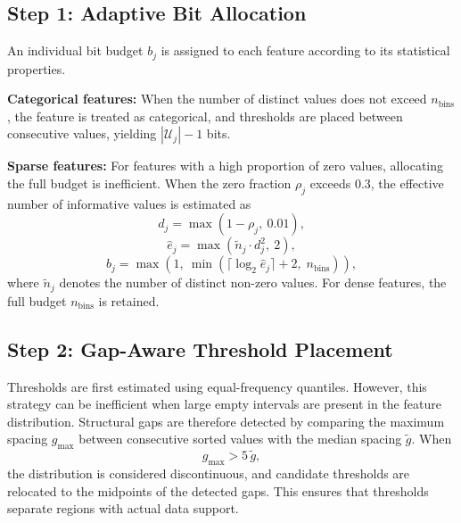 \documentclass[journal,twoside,web]{ieeecolor}
\begin{document}
\subsection{Step 1: Adaptive Bit Allocation}
\label{subsec:budget}

An individual bit budget $b_j$ is assigned to each feature according
to its statistical properties.

\textbf{Categorical features:} When the number of distinct values
does not exceed $n_\text{bins}$, the feature is treated as
categorical, and thresholds are placed between consecutive values,
yielding $|\mathcal{U}_j| - 1$ bits.

\textbf{Sparse features:} For features with a high proportion of
zero values, allocating the full budget is inefficient. When the
zero fraction $\rho_j$ exceeds 0.3, the effective number of
informative values is estimated as
\begin{equation}
  d_j = \max(1 - \rho_j,\ 0.01),
\end{equation}
\begin{equation}
  \hat{e}_j = \max\!\left(\tilde{n}_j \cdot d_j^{2},\ 2\right),
\end{equation}
\begin{equation}
  b_j = \max\!\left(1,\ \min\!\left(
        \lceil \log_2 \hat{e}_j \rceil + 2,\;
        n_\text{bins}\right)\right),
\end{equation}
where $\tilde{n}_j$ denotes the number of distinct non-zero values.
For dense features, the full budget $n_\text{bins}$ is retained.

\subsection{Step 2: Gap-Aware Threshold Placement}
\label{subsec:gaps}

Thresholds are first estimated using equal-frequency quantiles.
However, this strategy can be inefficient when large empty intervals
are present in the feature distribution. Structural gaps are therefore
detected by comparing the maximum spacing
$g_\text{max}$ between consecutive sorted values with the median
spacing $\tilde{g}$. When
\begin{equation}
  g_\text{max} > 5\,\tilde{g},
\end{equation}
the distribution is considered discontinuous, and candidate
thresholds are relocated to the midpoints of the detected gaps.
This ensures that thresholds separate regions with actual data
support.
\end{document}
